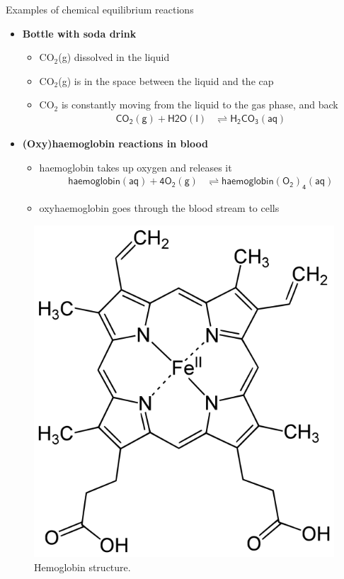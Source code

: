 \begin{frame}{Examples of chemical equilibrium reactions}
%
\lcol

\begin{itemize}
	\item \alert{\textbf{Bottle with soda drink}}
	\begin{itemize}
		\item CO$_2$(g) dissolved in the liquid
		\item CO$_2$(g) is in the space between the liquid and the cap
		\item CO$_2$ is constantly moving from the liquid to the gas phase, and back
		\begin{align*}
			\mathsf{CO_2(g) + H2O(l)} & \rightleftharpoons \mathsf{H_2CO_3(aq)}
		\end{align*}
	\end{itemize}
%
	\pause
	\item \alert{\textbf{(Oxy)haemoglobin reactions in blood}}
	\begin{itemize}
		\item haemoglobin takes up oxygen and releases it
		\begin{align*}
			\mathsf{haemoglobin(aq) + 4 O_2(g) } & \rightleftharpoons 	
			\mathsf{haemoglobin(O_2)_4(aq)}
		\end{align*}
		\item oxyhaemoglobin goes through the blood stream to cells
	\end{itemize}
\end{itemize}      

\rcol

\begin{figure}
\centering
\includegraphics[width=0.8\columnwidth]{figures/applications/hemoglobin.png}
\caption*{Hemoglobin structure.}
\end{figure}

\ecol

\end{frame}

